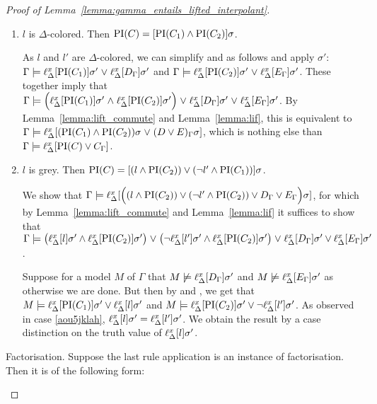 \begin{proof}[Proof of Lemma~\ref{lemma:gamma_entails_lifted_interpolant}]
\begin{description}
\begin{enumerate}
				\item $l$ is $\Delta$-colored. Then $\operatorname{PI}(C) = [\operatorname{PI}(C_1) \land \operatorname{PI}(C_2)]\sigma$.

					As $l$ and $l'$ are $\Delta$-colored, we can simplify \markA{} and \markB{} as follows and apply $\sigma'$:
					$\Gamma \models \ell_{\Delta}^{x}[\operatorname{PI}(C_1)]\sigma' \;{\lor}\; \ell_{\Delta}^{x}[D_\Gamma]\sigma' $ and $\Gamma \models \ell_{\Delta}^{x}[\operatorname{PI}(C_2)]\sigma' \;{\lor}\; \ell_{\Delta}^{x}[E_\Gamma]\sigma'$.
					These together imply that 
					$\Gamma \models \Big(\ell_{\Delta}^{x}[\operatorname{PI}(C_1)]\sigma' \;{\land}\; \ell_{\Delta}^{x}[\operatorname{PI}(C_2)]\sigma'\Big) \;{\lor}\; \ell_{\Delta}^{x}[D_\Gamma]\sigma' \;{\lor}\; \ell_{\Delta}^{x}[E_\Gamma]\sigma'$.
					By Lemma~\ref{lemma:lift_commute} and Lemma~\ref{lemma:lif}, this is equivalent to 
					$\Gamma \models \ell_{\Delta}^{x}[(\operatorname{PI}(C_1) \land \operatorname{PI}(C_2))\sigma \;{\lor}\; (D \lor E)_\Gamma\sigma]$, which is nothing else than
					$\Gamma \models \ell_{\Delta}^{x}[\operatorname{PI}(C) \lor C_\Gamma]$.

				\item $l$ is grey. Then $\operatorname{PI}(C) = [(l \land \operatorname{PI}(C_2) ) \lor (\lnot l' \land \operatorname{PI}(C_1))]\sigma$.

					We show that $\Gamma \models\allowbreak \ell_{\Delta}^{x}[ \Big((l \land \operatorname{PI}(C_2) ) \lor\allowbreak (\lnot l' \land \operatorname{PI}(C_2)) \lor D_\Gamma \lor E_\Gamma\Big)\sigma]$, for which by Lemma~\ref{lemma:lift_commute} and Lemma~\ref{lemma:lif} it suffices to show that 
					$\Gamma \models\allowbreak \big(\ell_{\Delta}^{x}[l]\sigma' \land \ell_{\Delta}^{x}[\operatorname{PI}(C_2)]\sigma'\big)\;{\lor}\;\allowbreak \big(\lnot \ell_{\Delta}^{x}[l']\sigma' \land \ell_{\Delta}^{x}[\operatorname{PI}(C_2)]\sigma'\big)\;{\lor}\;\allowbreak \ell_{\Delta}^{x}[D_\Gamma]\sigma' \lor \ell_{\Delta}^{x}[E_\Gamma]\sigma'$.

					Suppose for a model $M$ of $\Gamma$ that  $M \not\models \ell_{\Delta}^{x}[D_\Gamma]\sigma'$ and $M\not\models \ell_{\Delta}^{x}[E_\Gamma]\sigma'$ as otherwise we are done.
					But then by \markA{} and \markB{}, we get that 
					$M \models \ell_{\Delta}^{x}[\operatorname{PI}(C_1)]\sigma' \lor \ell_{\Delta}^{x}[l]\sigma'$ and
					$M \entails\nolinebreak \lifdelta{\PI(C_2)}\sigma' \lor \lnot\lifdelta{l'}\sigma'$.
					As observed in case \ref{aou5jklah}, $\ell_{\Delta}^{x}[l]\sigma' = \ell_{\Delta}^{x}[l']\sigma'$.
					We obtain the result by a case distinction on the truth value of $\ell_{\Delta}^{x}[l]\sigma'$.

			\end{enumerate}

		\item{Factorisation.}
			Suppose the last rule application is an instance of factorisation. Then it is of the following form:
			\begin{prooftree}
			\end{prooftree}


\end{description}
\end{proof}
